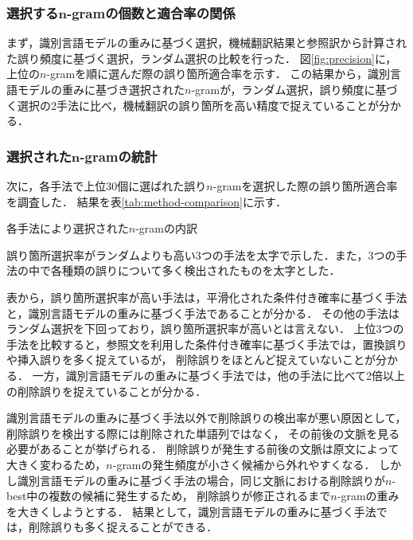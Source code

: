 \documentclass[japanese]{jnlp_1.4}
\begin{document}
\subsubsection{選択する$\boldsymbol{n}$-gramの個数と適合率の関係}
\label{sec:pr-curve}

まず，識別言語モデルの重みに基づく選択，機械翻訳結果と参照訳から計算された誤り頻度に基づく選択，ランダム選択の比較を行った．
図\ref{fig:precision}に，上位の$n$-gramを順に選んだ際の誤り箇所適合率を示す．
この結果から，識別言語モデルの重みに基づき選択された$n$-gramが，ランダム選択，誤り頻度に基づく選択の2手法に比べ，機械翻訳の誤り箇所を高い精度で捉えていることが分かる．


\subsubsection{選択された$\boldsymbol{n}$-gramの統計}

次に，各手法で上位30個に選ばれた誤り$n$-gramを選択した際の誤り箇所適合率を調査した．
結果を表\ref{tab:method-comparison}に示す．

\begin{table}[b]
\caption{各手法により選択された$n$-gramの内訳}
\label{tab:method-comparison}

\vspace{4pt}\small
誤り箇所選択率がランダムよりも高い3つの手法を太字で示した．また，3つの手法の中で各種類の誤りについて多く検出されたものを太字とした．
\end{table}

表から，誤り箇所選択率が高い手法は，平滑化された条件付き確率に基づく手法と，識別言語モデルの重みに基づく手法であることが分かる．
その他の手法はランダム選択を下回っており，誤り箇所選択率が高いとは言えない．
上位3つの手法を比較すると，参照文を利用した条件付き確率に基づく手法では，置換誤りや挿入誤りを多く捉えているが，
削除誤りをほとんど捉えていないことが分かる．
一方，識別言語モデルの重みに基づく手法では，他の手法に比べて2倍以上の削除誤りを捉えていることが分かる．

識別言語モデルの重みに基づく手法以外で削除誤りの検出率が悪い原因として，削除誤りを検出する際には削除された単語列ではなく，
その前後の文脈を見る必要があることが挙げられる．
削除誤りが発生する前後の文脈は原文によって大きく変わるため，$n$-gramの発生頻度が小さく候補から外れやすくなる．
しかし識別言語モデルの重みに基づく手法の場合，同じ文脈における削除誤りが$n$-best中の複数の候補に発生するため，
削除誤りが修正されるまで$n$-gramの重みを大きくしようとする．
結果として，識別言語モデルの重みに基づく手法では，削除誤りも多く捉えることができる．
\end{document}
